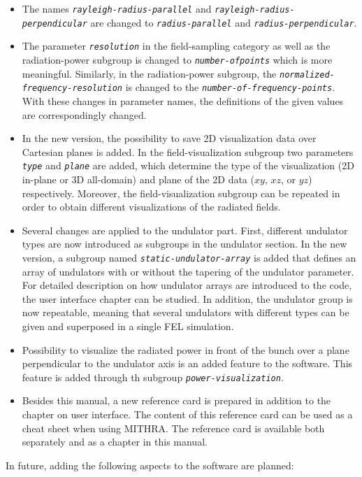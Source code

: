 \begin{itemize}
	\item The names {\tt \em \small rayleigh-radius-parallel} and {\tt \em \small rayleigh-radius-perpendicular} are changed to {\tt \em \small radius-parallel} and {\tt \em \small radius-perpendicular}.
	\item The parameter {\tt \em \small resolution} in the field-sampling category as well as the radiation-power subgroup is changed to {\tt \em \small number-of\-points} which is more meaningful. Similarly, in the radiation-power subgroup, the {\tt \em \small normalized-frequency-resolution} is changed to the {\tt \em \small number-of-frequency-points}. With these changes in parameter names, the definitions of the given values are correspondingly changed.
	\item In the new version, the possibility to save 2D visualization data over Cartesian planes is added. In the field-visualization subgroup two parameters {\tt \em \small type} and {\tt \em \small plane} are added, which determine the type of the visualization (2D in-plane or 3D all-domain) and plane of the 2D data ($xy$, $xz$, or $yz$) respectively. Moreover, the field-visualization subgroup can be repeated in order to obtain different visualizations of the radiated fields.
	\item Several changes are applied to the undulator part. First, different undulator types are now introduced as subgroups in the undulator section. In the new version, a subgroup named {\em \tt \small static-undulator-array} is added that defines an array of undulators with or without the tapering of the undulator parameter. For detailed description on how undulator arrays are introduced to the code, the user interface chapter can be studied. In addition, the undulator group is now repeatable, meaning that several undulators with different types can be given and superposed in a single FEL simulation.
	\item Possibility to visualize the radiated power in front of the bunch over a plane perpendicular to the undulator axis is an added feature to the software. This feature is added through th subgroup {\tt \em \small power-visualization}.
	\item Besides this manual, a new reference card is prepared in addition to the chapter on user interface. The content of this reference card can be used as a cheat sheet when using MITHRA. The reference card is available both separately and as a chapter in this manual. 
\end{itemize}
%
In future, adding the following aspects to the software are planned:
